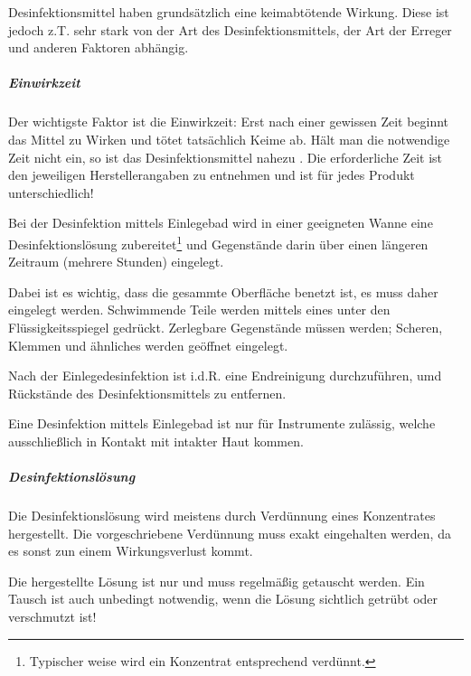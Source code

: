 {
Desinfektionsmittel haben grundsätzlich eine keimabtötende Wirkung. Diese ist
jedoch z.T. sehr stark von der Art des Desinfektionsmittels, der Art der
Erreger und anderen Faktoren abhängig.

\subparagraph{Einwirkzeit} Der wichtigste Faktor ist die Einwirkzeit: Erst nach
einer gewissen Zeit beginnt das Mittel zu Wirken und tötet tatsächlich Keime ab. Hält
man die notwendige Zeit nicht ein, so ist das Desinfektionsmittel nahezu
. Die erforderliche Zeit ist den jeweiligen Herstellerangaben
zu entnehmen und ist für jedes Produkt unterschiedlich! 
}{
	
}{}{}{}

{
Bei der Desinfektion mittels Einlegebad wird in einer geeigneten Wanne eine
Desinfektionslösung zubereitet\footnote{Typischer weise wird ein Konzentrat
entsprechend verdünnt.} und Gegenstände darin über einen längeren Zeitraum
(mehrere Stunden) eingelegt. 


Dabei ist es wichtig, dass die gesammte Oberfläche benetzt ist, es muss daher
 eingelegt werden. Schwimmende Teile werden mittels eines
 unter den Flüssigkeitsspiegel gedrückt. Zerlegbare
Gegenstände müssen  werden; Scheren, Klemmen und
ähnliches werden geöffnet eingelegt.

Nach der Einlegedesinfektion ist i.d.R. eine Endreinigung durchzuführen, umd
Rückstände des Desinfektionsmittels zu entfernen.

Eine Desinfektion mittels Einlegebad ist nur für Instrumente zulässig, welche
ausschließlich in Kontakt mit intakter Haut kommen. 

\subparagraph{Desinfektionslösung}
Die Desinfektionslösung wird meistens durch Verdünnung eines Konzentrates
hergestellt. Die vorgeschriebene Verdünnung muss exakt eingehalten werden, da
es sonst zun einem Wirkungsverlust kommt.


Die hergestellte Lösung ist nur  und muss regelmäßig
getauscht werden. Ein Tausch ist auch unbedingt notwendig, wenn die Lösung sichtlich
getrübt oder verschmutzt ist!


}{
	
}{}{}{}


